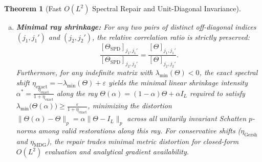 \documentclass[default,sn-mathphys,Numbered]{sn-jnl}
\theoremstyle{thmstyleone}
\newtheorem{theorem}{Theorem}
\theoremstyle{thmstylethree}
\theoremstyle{thmstyletwo}
\begin{document}
\begin{theorem}[Fast $O(L^2)$ Spectral Repair and Unit-Diagonal Invariance]
\begin{enumerate}[(a)]
    \item[(f)] \textbf{Minimal ray shrinkage:} For any two pairs of distinct off-diagonal indices $(j_1, j_1')$ and $(j_2, j_2')$, the relative correlation ratio is strictly preserved:
    \begin{equation}
    \label{eq:ratio_preservation}
    \frac{[\Theta_{\mathrm{SPD}}]_{j_1, j_1'}}{[\Theta_{\mathrm{SPD}}]_{j_2, j_2'}} = \frac{[\Theta]_{j_1, j_1'}}{[\Theta]_{j_2, j_2'}}.
    \end{equation}
    Furthermore, for any indefinite matrix with $\lambda_{\min}(\Theta) < 0$, the exact spectral shift $\eta_{\mathrm{exact}} = -\lambda_{\min}(\Theta) + \varepsilon$ yields the minimal linear shrinkage intensity $\alpha^* = \frac{\eta_{\mathrm{exact}}}{1+\eta_{\mathrm{exact}}}$ along the ray $\Theta(\alpha) = (1 - \alpha)\Theta + \alpha I_L$ required to satisfy $\lambda_{\min}\bigl(\Theta(\alpha)\bigr) \ge \frac{\varepsilon}{1+\eta_{\mathrm{exact}}}$, minimizing the distortion $\|\Theta(\alpha) - \Theta\|_p = \alpha \|\Theta - I_L\|_p$ across all unitarily invariant Schatten $p$-norms among valid restorations along this ray. For conservative shifts ($\eta_{\mathrm{Gersh}}$ and $\eta_{\mathrm{MDG}}$), the repair trades minimal metric distortion for closed-form $O(L^2)$ evaluation and analytical gradient availability.
\end{enumerate}
\end{theorem}
\end{document}
